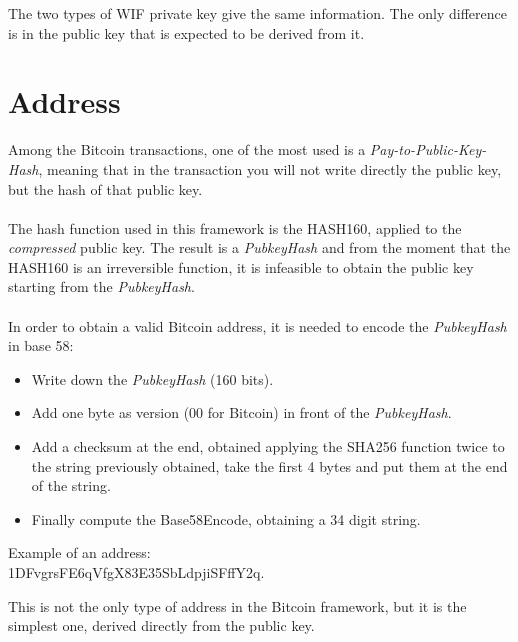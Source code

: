\begin{remark}
	The two types of WIF private key give the same information. The only difference is in the public key that is expected to be derived from it. 
\end{remark}

\section{Address}
Among the Bitcoin transactions, one of the most used is a \textit{Pay-to-Public-Key-Hash}, meaning that in the transaction you will not write directly the public key, but the hash of that public key.
\\ \\
The hash function used in this framework is the HASH160, applied to the \textit{compressed} public key. The result is a \textit{PubkeyHash} and from the moment that the HASH160 is an irreversible function, it is infeasible to obtain the public key starting from the \textit{PubkeyHash}. 
\\ \\
In order to obtain a valid Bitcoin address, it is needed to encode the \textit{PubkeyHash} in base 58:

\begin{itemize}
	\item Write down the \textit{PubkeyHash} (160 bits).
	\item Add one byte as version ($00$ for Bitcoin) in front of the \textit{PubkeyHash}.
	\item Add a checksum at the end, obtained applying the SHA256 function twice to the string previously obtained, take the first 4 bytes and put them at the end of the string.
	\item Finally compute the Base58Encode, obtaining a 34 digit string.
\end{itemize}
Example of an address: \\
1DFvgrsFE6qVfgX83E35SbLdpjiSFffY2q.

\begin{remark}
	This is not the only type of address in the Bitcoin framework, but it is the simplest one, derived directly from the public key. 
\end{remark}

